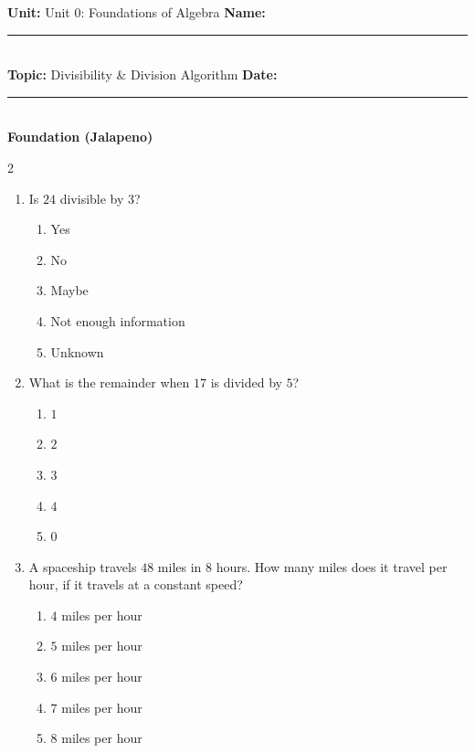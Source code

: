 \documentclass[10pt]{article}
\begin{document}
\enlargethispage{2.5cm}

\begin{tcolorbox}[colback=mainblue!5, colframe=mainblue, sharp corners, boxrule=0.5pt]
    \small \textbf{Unit:} Unit 0: Foundations of Algebra \hfill \textbf{Name:} \rule{3cm}{0.4pt} \\
    \small \textbf{Topic:} Divisibility & Division Algorithm \hfill \textbf{Date:} \rule{2cm}{0.4pt} \\
    \centering \textbf{\large Foundation (Jalapeno)}
\end{tcolorbox}

\vspace{0.2cm}

\begin{multicols}{2}
\begin{enumerate}[label=\textbf{Q\arabic*.}, leftmargin=*, itemsep=6pt, parsep=0pt]

  \item \small Is $24$ divisible by $3$?
  \begin{enumerate}[label=(\Alph*), leftmargin=0.6cm, nosep, itemsep=2pt]
    \item Yes
    \item No
    \item Maybe
    \item Not enough information
    \item Unknown
  \end{enumerate}

  \item \small What is the remainder when $17$ is divided by $5$?
  \begin{enumerate}[label=(\Alph*), leftmargin=0.6cm, nosep, itemsep=2pt]
    \item $1$
    \item $2$
    \item $3$
    \item $4$
    \item $0$
  \end{enumerate}

  \item \small A spaceship travels $48$ miles in $8$ hours. How many miles does it travel per hour, if it travels at a constant speed?
  \begin{enumerate}[label=(\Alph*), leftmargin=0.6cm, nosep, itemsep=2pt]
    \item $4$ miles per hour
    \item $5$ miles per hour
    \item $6$ miles per hour
    \item $7$ miles per hour
    \item $8$ miles per hour
  \end{enumerate}


\end{enumerate}
\end{multicols}
\end{document}
